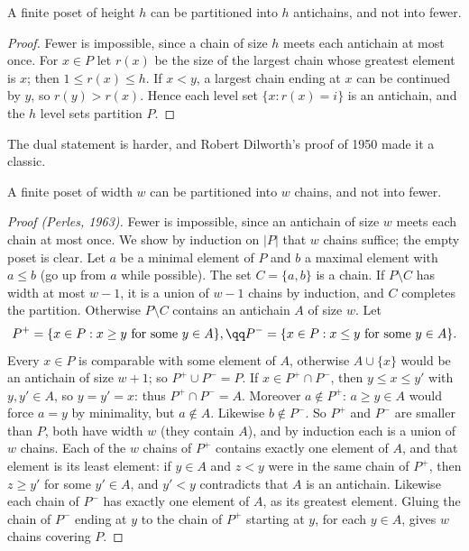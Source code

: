 \begin{theorem}[Mirsky, 1971]\label{orders:thm:mirsky}
A finite poset of height $h$ can be partitioned into $h$ antichains, and not into fewer.
\end{theorem}
\begin{proof}
Fewer is impossible, since a chain of size $h$ meets each antichain at most once. For $x\in P$ let $r(x)$ be the size of the largest
chain whose greatest element is $x$; then $1\le r(x)\le h$. If $x<y$, a largest chain ending at $x$ can be continued by $y$, so $r(y)>r(x)$. Hence
each level set $\{x:r(x)=i\}$ is an antichain, and the $h$ level sets partition $P$.
\end{proof}

The dual statement is harder, and Robert Dilworth's proof of 1950 made it a classic.

\begin{theorem}[Dilworth, 1950]\label{orders:thm:dilworth}
A finite poset of width $w$ can be partitioned into $w$ chains, and not into fewer.
\end{theorem}
\begin{proof}[Proof (Perles, 1963)]
Fewer is impossible, since an antichain of size $w$ meets each chain at most once. We show by induction on $|P|$ that $w$
chains suffice; the empty poset is clear. Let $a$ be a minimal element of $P$ and $b$ a maximal element with $a\le b$ (go up from $a$
while possible). The set $C=\{a,b\}$ is a chain. If $P\setminus C$ has width at most $w-1$, it is a union of $w-1$ chains by induction, and $C$
completes the partition. Otherwise $P\setminus C$ contains an antichain $A$ of size $w$. Let
\[
\begin{gathered}P^+=\{x\in P:x\ge y\text{ for some }y\in A\},\qq P^-=\{x\in P:x\le y\text{ for some }y\in A\}.\end{gathered}
\]
Every $x\in P$ is comparable with some element of $A$, otherwise $A\cup\{x\}$ would be an antichain of size $w+1$; so $P^+\cup P^-=P$. If $x\in P^+\cap P^-$,
then $y\le x\le y'$ with $y,y'\in A$, so $y=y'=x$: thus $P^+\cap P^-=A$. Moreover $a\notin P^+$: $a\ge y\in A$ would force $a=y$ by minimality, but $a\notin A$.
Likewise $b\notin P^-$. So $P^+$ and $P^-$ are smaller than $P$, both have width $w$ (they contain $A$), and by induction each is a union of $w$
chains. Each of the $w$ chains of $P^+$ contains exactly one element of $A$, and that element is its least element: if $y\in A$ and $z<y$
were in the same chain of $P^+$, then $z\ge y'$ for some $y'\in A$, and $y'<y$ contradicts that $A$ is an antichain. Likewise each chain of
$P^-$ has exactly one element of $A$, as its greatest element. Gluing the chain of $P^-$ ending at $y$ to the chain of $P^+$ starting at
$y$, for each $y\in A$, gives $w$ chains covering $P$.
\end{proof}

